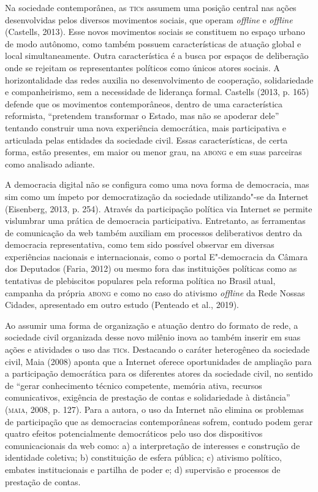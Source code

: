 Na sociedade contemporânea, as \textsc{tic}s assumem uma posição central nas
ações desenvolvidas pelos diversos movimentos sociais, que operam
\emph{offline} e \emph{offline} (Castells, 2013). Esse novos movimentos sociais se
constituem no espaço urbano de modo autônomo, como também possuem
características de atuação global e local simultaneamente. Outra
característica é a busca por espaços de deliberação onde se rejeitam os
representantes políticos como únicos atores sociais. A horizontalidade
das redes auxilia no desenvolvimento de cooperação, solidariedade e
companheirismo, sem a necessidade de liderança formal. Castells (2013,
p. 165) defende que os movimentos contemporâneos, dentro de uma
característica reformista, ``pretendem transformar o Estado, mas não se
apoderar dele'' tentando construir uma nova experiência democrática, mais
participativa e articulada pelas entidades da sociedade civil. Essas
características, de certa forma, estão presentes, em maior ou menor
grau, na \textsc{abong} e em suas parceiras como analisado adiante.

A democracia digital não se configura como uma nova forma de democracia,
mas sim como um ímpeto por democratização da sociedade utilizando"-se da
Internet (Eisenberg, 2013, p. 254). Através da participação política via
Internet se permite vislumbrar uma prática de democracia participativa.
Entretanto, as ferramentas de comunicação da web também auxiliam em
processos deliberativos dentro da democracia representativa, como tem
sido possível observar em diversas experiências nacionais e
internacionais, como o portal E"-democracia da Câmara dos Deputados
(Faria, 2012) ou mesmo fora das instituições políticas como as
tentativas de plebiscitos populares pela reforma política no Brasil
atual, campanha da própria \textsc{abong} e como no caso do ativismo \emph{offline} da
Rede Nossas Cidades, apresentado em outro estudo (Penteado et al.,
2019).

Ao assumir uma forma de organização e atuação dentro do formato de rede,
a sociedade civil organizada desse novo milênio inova ao também inserir
em suas ações e atividades o uso das \textsc{tic}s. Destacando o caráter
heterogêneo da sociedade civil, Maia (2008) aponta que a Internet
oferece oportunidades de ampliação para a participação democrática para
os diferentes atores da sociedade civil, no sentido de ``gerar
conhecimento técnico competente, memória ativa, recursos comunicativos,
exigência de prestação de contas e solidariedade à distância'' (\textsc{maia},
2008, p. 127). Para a autora, o uso da Internet não elimina os problemas
de participação que as democracias contemporâneas sofrem, contudo podem
gerar quatro efeitos potencialmente democráticos pelo uso dos
dispositivos comunicacionais da web como: a) a interpretação de
interesses e construção de identidade coletiva; b) constituição de
esfera pública; c) ativismo político, embates institucionais e partilha
de poder e; d) supervisão e processos de prestação de contas.

